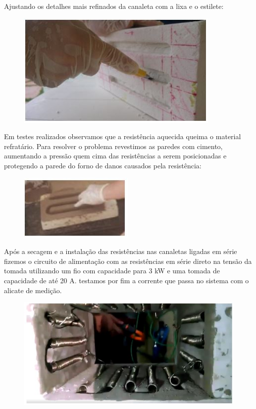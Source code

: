 Ajustando os detalhes  mais refinados da canaleta com a lixa e o estilete:
\begin{figure}[H]
	\centering
	\label{foto6}
	\includegraphics[keepaspectratio=true,scale=1.0]{figuras/alimentacao11.JPG}
\end{figure}

Em testes realizados observamos que a resistência aquecida queima o material refratário. Para resolver o problema revestimos as paredes com cimento, aumentando a pressão quem cima das resistências a serem posicionadas e protegendo a parede do forno de danos causados pela resistência:
\begin{figure}[H]
	\centering
	\label{foto7}
	\includegraphics[keepaspectratio=true,scale=1.0]{figuras/alimentacao12.JPG}
\end{figure}

Após a secagem e a instalação das resistências nas canaletas ligadas em série fizemos o circuito de alimentação com as resistências em série direto na tensão da tomada utilizando um fio com capacidade para 3 kW e uma tomada de capacidade de até 20 A. testamos por fim a corrente que passa no sistema com o alicate de medição.
\begin{figure}[H]
	\centering
	\label{foto8}
	\includegraphics[keepaspectratio=true,scale=1.0]{figuras/alimentacao13.JPG}
\end{figure}

